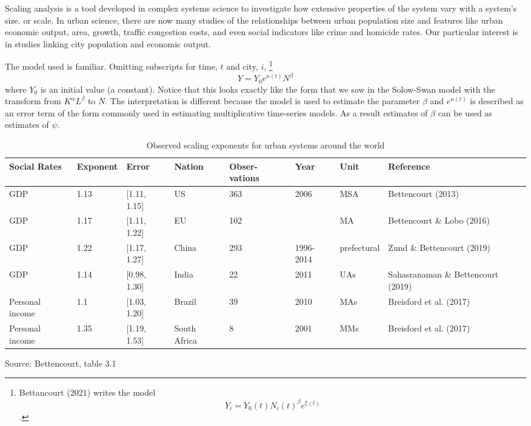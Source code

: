 Scaling analysis is a tool developed in complex systems science to investigate how extensive properties of the system vary with a system's size.  or scale.  In urban science, there are now many studies of  the relationships between urban population size and  features like urban economic output,  area, growth, traffic congestion costs, and even social  indicators like crime and homicide rates. Our particular interest is in studies linking city population  and  economic output. 

The model used is familiar. Omitting subscripts for time, $t$ and city, $i$, \footnote{Bettancourt (2021) writes the model \[Y_i = Y_0(t)N_i(t)^\beta e^{\xi(t)}\].}
\[Y = Y_0e^{n(t)}N^\beta\]
where $Y_0$ is an initial value (a constant). Notice that this looks exactly like the form that we saw in the 
\gls{Solow-Swan model} with the transform from $K^\alpha L^\beta$ to $N$.  The interpretation is different because the model is used to estimate the parameter $\beta$ and $e^{n(t)}$ is described  as an error term of the form commonly used in estimating multiplicative time-series models. As a result estimates of $\beta$  can be used as estimates  of $\psi$.

\begin{table}[htb]\small
\centering
\begin{tabular}{|p{1.5cm}|l|l|p{1.5cm}|p{1.4cm}|p{}|l|p{2.5cm}|}\hline
\textbf{Social Rates} & \textbf{Exponent} & \textbf{Error} & \textbf{Nation} & \textbf{Obser-vations} & \textbf{Year} & \textbf{Unit} & \textbf{Reference} \\ \hline   
GDP             & 1.13 & [1.11, 1.15]  & US           & 363 & 2006        & MSA  & Bettencourt (2013)                 \\ \hline
GDP             & 1.17 & [1.11, 1.22]  & EU           & 102 &             & MA   & Bettencourt  \& Lobo        (2016) \\ \hline
GDP             & 1.22 & [1.17, 1.27]  & China        & 293 & 1996-2014   & prefectural & Zund  \& Bettencourt (2019) \\ \hline
GDP             & 1.14 & [0.98, 1.30]  & India        & 22  & 2011        & UAs  & Sahasranaman \& Bettencourt (2019) \\ \hline
Personal income & 1.1  & [1.03, 1.20]  & Brazil       & 39  & 2010        & MAs  & Breisford et al.  (2017)           \\ \hline
Personal income & 1.35 & [1.19, 1.53]  & South Africa & 8   & 2001        & MMs  & Breisford et al.  (2017)           \\ \hline
\end{tabular}
\caption[Observed scaling exponents]{Observed scaling exponents for urban systems around the world}
\label{table-scaling-exponents}
\small Source: Bettencourt, table 3.1

\end{table}


